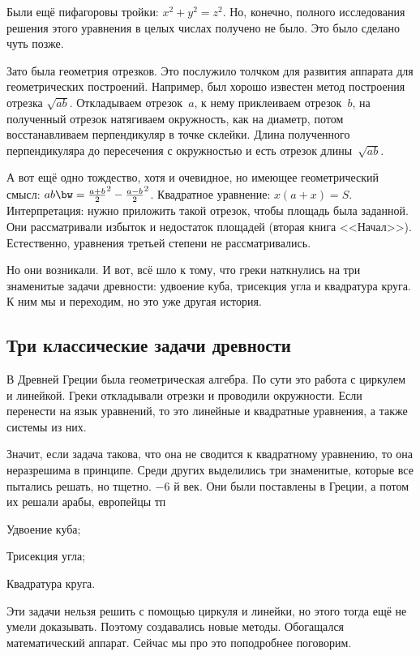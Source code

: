 \documentclass[a4paper,oneside,fleqn,10pt]{article}
\begin{document}
Были ещё пифагоровы тройки: $x^2 + y^2 = z^2$.
Но, конечно, полного исследования решения этого уравнения в целых числах получено не было.
Это было сделано чуть позже.

Зато была геометрия отрезков. Это послужило толчком для развития аппарата для геометрических построений.
Например, был хорошо известен метод построения отрезка $\sqrt{ab}$. Откладываем отрезок~$a$,
к нему приклеиваем отрезок~$b$, на полученный отрезок натягиваем окружность, как на диаметр,
потом восстанавливаем перпендикуляр в точке склейки. Длина полученного перпендикуляра до пересечения с
окружностью и есть отрезок длины~$\sqrt{ab}$.

А вот ещё одно тождество, хотя и очевидное, но имеющее геометрический смысл:
$ab \bw= \frac{a+b}{2}^2 - \frac{a-b}{2}^2$.
Квадратное уравнение:
$x(a+x) = S$.
Интерпретация: нужно приложить такой отрезок, чтобы площадь была заданной.
Они рассматривали избыток и недостаток площадей (вторая книга <<Начал>>).
Естественно, уравнения третьей степени не рассматривались.

Но они возникали. И вот, всё шло к тому, что греки наткнулись на три знаменитые задачи древности:
удвоение куба, трисекция угла и квадратура круга. К ним мы и переходим, но это уже другая история.


\subsection{Три классические задачи древности}

В Древней Греции была геометрическая алгебра. По сути это работа с циркулем и линейкой. Греки откладывали отрезки
и проводили окружности. Если перенести на язык уравнений, то это линейные и квадратные уравнения,
а также системы из них.

Значит, если задача такова, что она не сводится к квадратному уравнению, то она неразрешима в принципе.
Среди других выделились три знаменитые, которые все пытались решать, но тщетно.
$-6$ й век. Они были поставлены в Греции, а потом их решали арабы, европейцы тп

\begin{items}{-3}
\item Удвоение куба;
\item Трисекция угла;
\item Квадратура круга.
\end{items}

Эти задачи нельзя решить с помощью циркуля и линейки, но этого тогда ещё не умели доказывать.
Поэтому создавались новые методы. Обогащался математический аппарат.
Сейчас мы про это поподробнее поговорим.
\end{document}
